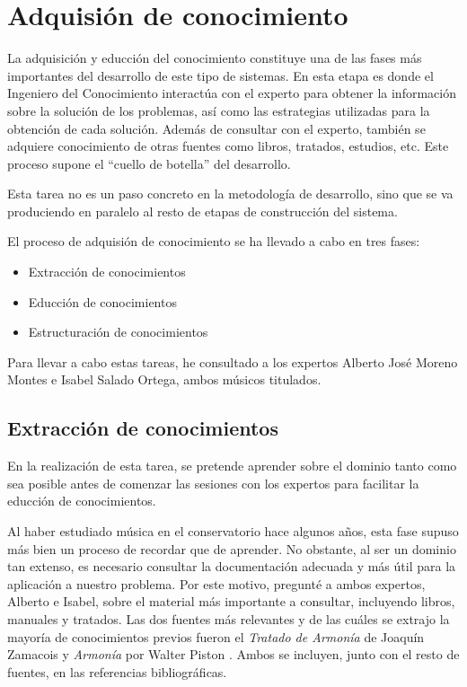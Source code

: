 \chapter{Adquisión de conocimiento}

La adquisición y educción del conocimiento constituye una de las fases más importantes del desarrollo de este tipo de sistemas. En esta etapa es donde el Ingeniero del Conocimiento interactúa con el experto para obtener la información sobre la solución de los problemas, así como las estrategias utilizadas para la obtención de cada solución. Además de consultar con el experto, también se adquiere conocimiento de otras fuentes como libros, tratados, estudios, etc. Este proceso supone el ``cuello de botella'' del desarrollo.
 
Esta tarea no es un paso concreto en la metodología de desarrollo, sino que se va produciendo en paralelo al resto de etapas de construcción del sistema.

El proceso de adquisión de conocimiento se ha llevado a cabo en tres fases: 

\begin{itemize}
	\item Extracción de conocimientos
	\item Educción de conocimientos
	\item Estructuración de conocimientos
\end{itemize}
 
Para llevar a cabo estas tareas, he consultado a los expertos Alberto José Moreno Montes e Isabel Salado Ortega, ambos músicos titulados.  

\section{Extracción de conocimientos}

En la realización de esta tarea, se pretende aprender sobre el dominio tanto como sea posible antes de comenzar las sesiones con los expertos para facilitar la educción de conocimientos. 

Al haber estudiado música en el conservatorio hace algunos años, esta fase supuso más bien un proceso de recordar que de aprender. No obstante, al ser un dominio tan extenso, es necesario consultar la documentación adecuada y más útil para la aplicación a nuestro problema. Por este motivo, pregunté a ambos expertos, Alberto e Isabel, sobre el material más importante a consultar, incluyendo libros, manuales y tratados. Las dos fuentes más relevantes y de las cuáles se extrajo la mayoría de conocimientos previos fueron el \textit{Tratado de Armonía} de Joaquín Zamacois \cite{ZAMACOIS} y \textit{Armonía} por Walter Piston \cite{PISTON}. Ambos se incluyen, junto con el resto de fuentes, en las referencias bibliográficas. 

